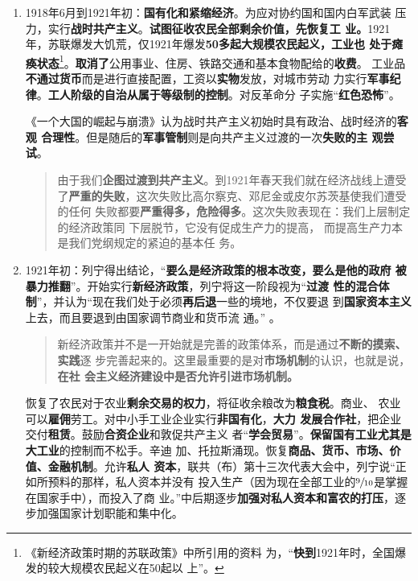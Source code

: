 \begin{enumerate}
\item 1918年6月到1921年初：\textbf{国有化和紧缩经济}。为应对协约国和国内白军武装
  压力，实行\textbf{战时共产主义}。\textbf{试图征收农民全部剩余价值，先恢复工
    业。}1921年，苏联爆发大饥荒，仅1921年爆发\textbf{50多起大规模农民起义，工业也
    处于瘫痪状态}\footnote{《新经济政策时期的苏联政策》中所引用的资料
    为，``\textbf{快到}1921年时，全国爆发的较大规模农民起义在50起以
    上''。}。\textbf{取消了}公用事业、住房、铁路交通和基本食物配给的\textbf{收费}。
  工业品\textbf{不通过货币}而是进行直接配置，工资以\textbf{实物}发放，对城市劳动
  力实行\textbf{军事纪律}。\textbf{工人阶级的自治从属于等级制的控制}。对反革命分
  子实施“\textbf{红色恐怖}”。

  《一个大国的崛起与崩溃》认为战时共产主义初始时具有政治、战时经济的\textbf{客观
    合理性}。但是随后的\textbf{军事管制}则是向共产主义过渡的一次\textbf{失败的主
    观尝试}。

  \begin{quotation}
    由于我们\textbf{企图过渡到共产主义}。到1921年春天我们就在经济战线上遭受
    了\textbf{严重的失败}，这次失败比高尔察克、邓尼金或皮尔苏茨基使我们遭受的任何
    失败都要\textbf{严重得多，危险得多}。这次失败表现在：我们上层制定的经济政策同
    下层脱节，它没有促成生产力的提高， 而提高生产力本是我们党纲规定的紧迫的基本任
    务。
  \end{quotation}

\item 1921年初：列宁得出结论，“\textbf{要么是经济政策的根本改变，要么是他的政府
    被暴力推翻}”。开始实行\textbf{新经济政策}，列宁将这一阶段视为``\textbf{过渡
    性的混合体制}''，并认为``现在我们处于必须\textbf{再后退}一些的境地，不仅要退
  到\textbf{国家资本主义}上去，而且要退到由国家调节商业和货币流
  通。'' 。


  \begin{quotation}
    新经济政策并不是一开始就是完善的政策体系，而是通过\textbf{不断的摸索、实践}逐
    步完善起来的。这里最重要的是对\textbf{市场机制}的认识，也就是说，\textbf{在社
      会主义经济建设中是否允许引进市场机制。}
  \end{quotation}

  恢复了农民对于农业\textbf{剩余交易的权力}，将征收余粮改为\textbf{粮食税}。商业、
  农业可以\textbf{雇佣}劳工。对中小手工业企业实行\textbf{非国有化}，\textbf{大力
    发展合作社}，把企业交付\textbf{租赁}。鼓励\textbf{合资企业}和敦促共产主义
  者“\textbf{学会贸易}”。\textbf{保留国有工业尤其是大工业}的控制而不松手。辛迪
  加、托拉斯涌现。恢复\textbf{商品、货币、市场、价值、金融机制}。允许\textbf{私人
    资本}，联共（布）第十三次代表大会中，列宁说“正如所预料的那样，私人资本并没有
  投入生产（因为现在全部工业的$\sfrac{9}{10}$是掌握在国家手中），而投入了商
  业。”中后期逐步\textbf{加强对私人资本和富农的打压}，逐步加强国家计划职能和集中化。


\end{enumerate}

